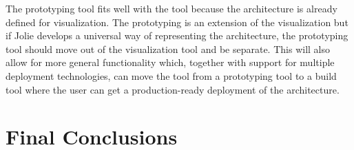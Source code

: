 The prototyping tool fits well with the tool because the architecture is already defined for visualization.
The prototyping is an extension of the visualization but if Jolie develops a universal way of representing the architecture, the prototyping tool should move out of the visualization tool and be separate.
This will also allow for more general functionality which, together with support for multiple deployment technologies, can move the tool from a prototyping tool to a build tool where the user can get a production-ready deployment of the architecture.

\section{Final Conclusions}
